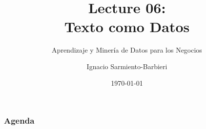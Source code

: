 \documentclass[
  shownotes,
  xcolor={svgnames},
  hyperref={colorlinks,citecolor=DarkBlue,linkcolor=DarkRed,urlcolor=DarkBlue}
  , aspectratio=169]{beamer}
\begin{document}
\title[Lecture 06]{Lecture 06: \\ Texto como Datos}
\subtitle{Aprendizaje y Minería de Datos para los Negocios}
\date{\today}

\author[Sarmiento-Barbieri]{Ignacio Sarmiento-Barbieri}


\begin{frame}[noframenumbering]
\maketitle
\end{frame}





\begin{frame}
\frametitle{Agenda}

\tableofcontents

\end{frame}

\end{document}
